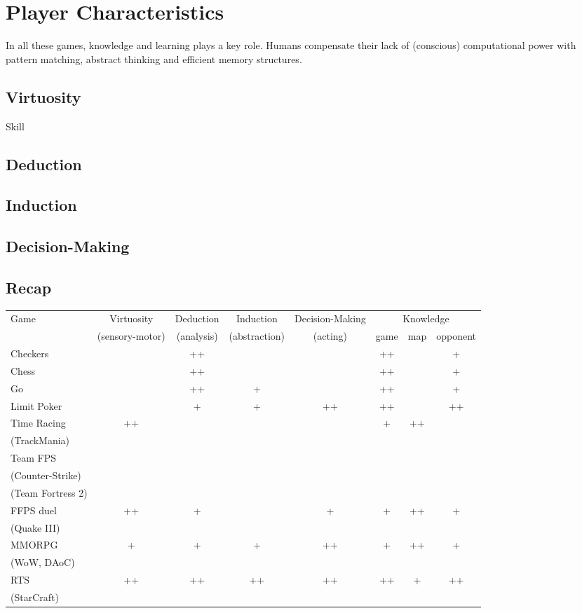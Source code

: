 \section{Player Characteristics}


In all these games, knowledge and learning plays a key role. Humans compensate their lack of (conscious) computational power with pattern matching, abstract thinking and efficient memory structures. 
\subsection{Virtuosity}
Skill
\subsection{Deduction}
\subsection{Induction}
\subsection{Decision-Making}
\subsection{Recap}
\begin{table}
\begin{tabular}{|l|ccccccc|}
\hline 
Game & Virtuosity & Deduction & Induction & Decision-Making & \multicolumn{3}{c|}{Knowledge} \\
     & (sensory-motor) & (analysis) & (abstraction) & (acting) & game & map & opponent \\
Checkers &   & ++ & &   & ++& &+ \\
Chess &   & ++ & &   & ++& &+ \\
Go &   & ++ & + &   & ++& &+ \\
Limit Poker &   & + & + & ++ & ++& &++ \\
Time Racing & ++ &   &   &   & +&++&  \\
(TrackMania) & & & & & & & \\
Team FPS & & & & & & & \\ 
(Counter-Strike) & & & & & & & \\ 
(Team Fortress 2) & & & & & & & \\ 
FFPS duel & ++ & + &   & + & +&++&+ \\
(Quake III) & & & & & & & \\ 
MMORPG & + & + & + & ++ & +&++&+ \\
(WoW, DAoC) & & & & & & & \\ 
RTS & ++ & ++ & ++ & ++ & ++&+&++ \\
(StarCraft) & & & & & & & \\
\hline
\end{tabular}
\end{table}

